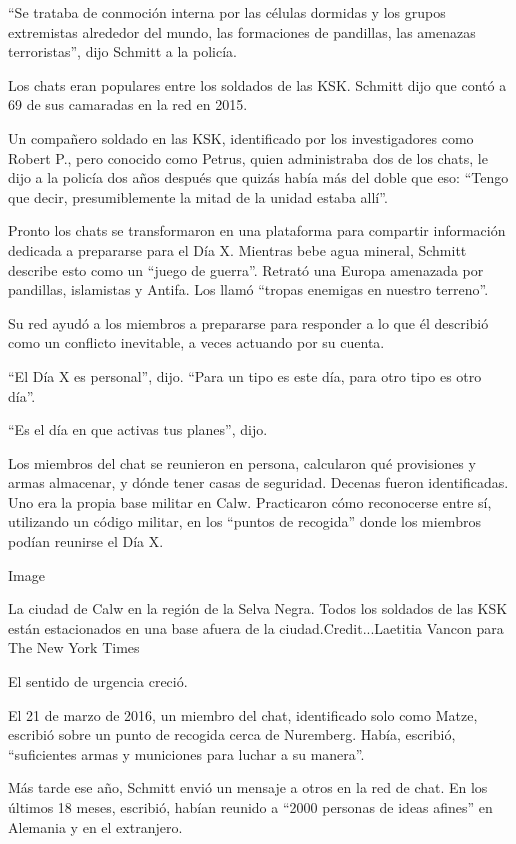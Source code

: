 ``Se trataba de conmoción interna por las células dormidas y los grupos
extremistas alrededor del mundo, las formaciones de pandillas, las
amenazas terroristas'', dijo Schmitt a la policía.

Los chats eran populares entre los soldados de las KSK. Schmitt dijo que
contó a 69 de sus camaradas en la red en 2015.

Un compañero soldado en las KSK, identificado por los investigadores
como Robert P., pero conocido como Petrus, quien administraba dos de los
chats, le dijo a la policía dos años después que quizás había más del
doble que eso: ``Tengo que decir, presumiblemente la mitad de la unidad
estaba allí''.

Pronto los chats se transformaron en una plataforma para compartir
información dedicada a prepararse para el Día X. Mientras bebe agua
mineral, Schmitt describe esto como un ``juego de guerra''. Retrató una
Europa amenazada por pandillas, islamistas y Antifa. Los llamó ``tropas
enemigas en nuestro terreno''.

Su red ayudó a los miembros a prepararse para responder a lo que él
describió como un conflicto inevitable, a veces actuando por su cuenta.

``El Día X es personal'', dijo. ``Para un tipo es este día, para otro
tipo es otro día''.

``Es el día en que activas tus planes'', dijo.

Los miembros del chat se reunieron en persona, calcularon qué
provisiones y armas almacenar, y dónde tener casas de seguridad. Decenas
fueron identificadas. Uno era la propia base militar en Calw.
Practicaron cómo reconocerse entre sí, utilizando un código militar, en
los ``puntos de recogida'' donde los miembros podían reunirse el Día X.

Image

La ciudad de Calw en la región de la Selva Negra. Todos los soldados de
las KSK están estacionados en una base afuera de la
ciudad.Credit...Laetitia Vancon para The New York Times

El sentido de urgencia creció.

El 21 de marzo de 2016, un miembro del chat, identificado solo como
Matze, escribió sobre un punto de recogida cerca de Nuremberg. Había,
escribió, ``suficientes armas y municiones para luchar a su manera''.

Más tarde ese año, Schmitt envió un mensaje a otros en la red de chat.
En los últimos 18 meses, escribió, habían reunido a ``2000 personas de
ideas afines'' en Alemania y en el extranjero.

